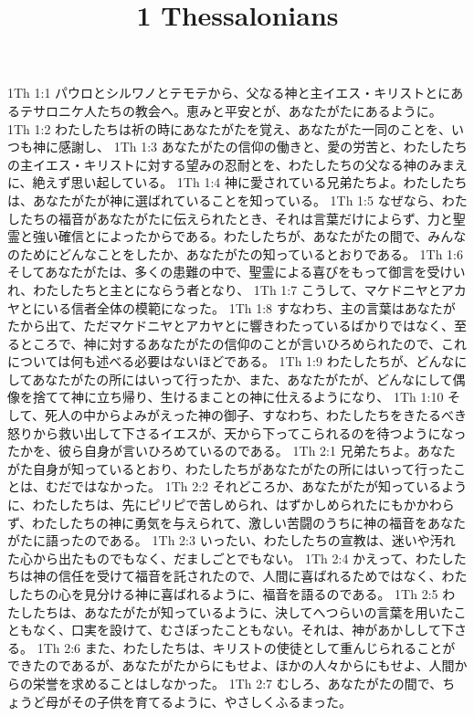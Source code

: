 

\title{1 Thessalonians}

1Th 1:1  パウロとシルワノとテモテから、父なる神と主イエス・キリストとにあるテサロニケ人たちの教会へ。恵みと平安とが、あなたがたにあるように。
1Th 1:2  わたしたちは祈の時にあなたがたを覚え、あなたがた一同のことを、いつも神に感謝し、
1Th 1:3  あなたがたの信仰の働きと、愛の労苦と、わたしたちの主イエス・キリストに対する望みの忍耐とを、わたしたちの父なる神のみまえに、絶えず思い起している。
1Th 1:4  神に愛されている兄弟たちよ。わたしたちは、あなたがたが神に選ばれていることを知っている。
1Th 1:5  なぜなら、わたしたちの福音があなたがたに伝えられたとき、それは言葉だけによらず、力と聖霊と強い確信とによったからである。わたしたちが、あなたがたの間で、みんなのためにどんなことをしたか、あなたがたの知っているとおりである。
1Th 1:6  そしてあなたがたは、多くの患難の中で、聖霊による喜びをもって御言を受けいれ、わたしたちと主とにならう者となり、
1Th 1:7  こうして、マケドニヤとアカヤとにいる信者全体の模範になった。
1Th 1:8  すなわち、主の言葉はあなたがたから出て、ただマケドニヤとアカヤとに響きわたっているばかりではなく、至るところで、神に対するあなたがたの信仰のことが言いひろめられたので、これについては何も述べる必要はないほどである。
1Th 1:9  わたしたちが、どんなにしてあなたがたの所にはいって行ったか、また、あなたがたが、どんなにして偶像を捨てて神に立ち帰り、生けるまことの神に仕えるようになり、
1Th 1:10  そして、死人の中からよみがえった神の御子、すなわち、わたしたちをきたるべき怒りから救い出して下さるイエスが、天から下ってこられるのを待つようになったかを、彼ら自身が言いひろめているのである。
1Th 2:1  兄弟たちよ。あなたがた自身が知っているとおり、わたしたちがあなたがたの所にはいって行ったことは、むだではなかった。
1Th 2:2  それどころか、あなたがたが知っているように、わたしたちは、先にピリピで苦しめられ、はずかしめられたにもかかわらず、わたしたちの神に勇気を与えられて、激しい苦闘のうちに神の福音をあなたがたに語ったのである。
1Th 2:3  いったい、わたしたちの宣教は、迷いや汚れた心から出たものでもなく、だましごとでもない。
1Th 2:4  かえって、わたしたちは神の信任を受けて福音を託されたので、人間に喜ばれるためではなく、わたしたちの心を見分ける神に喜ばれるように、福音を語るのである。
1Th 2:5  わたしたちは、あなたがたが知っているように、決してへつらいの言葉を用いたこともなく、口実を設けて、むさぼったこともない。それは、神があかしして下さる。
1Th 2:6  また、わたしたちは、キリストの使徒として重んじられることができたのであるが、あなたがたからにもせよ、ほかの人々からにもせよ、人間からの栄誉を求めることはしなかった。
1Th 2:7  むしろ、あなたがたの間で、ちょうど母がその子供を育てるように、やさしくふるまった。
